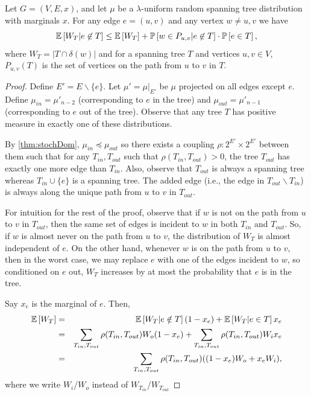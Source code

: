 \begin{lemma}\label{lem:wpath}
Let $G=(V,E,x)$, and let $\mu$ be a $\lambda$-uniform random spanning tree distribution with marginals $x$.
For any edge $e=(u,v)$ and any vertex $w\neq u,v$ we have
 $$ {\mathbb{E}}\left[W_T | e\not\in T\right] \leq {\mathbb{E}}\left[W_T\right] + {\mathbb{P}}\left[w\in P_{u,v} | e \not\in T\right]\cdot{\mathbb{P}}\left[e\in T\right] ,$$
 where $W_T=|T\cap \delta(w)|$ and for a spanning tree $T$ and vertices $u,v\in V$, $P_{u,v}(T)$ is the set of vertices on the path from $u$ to $v$ in $T$.
\end{lemma}
\begin{proof}
Define $E'=E\smallsetminus \{e\}$.
Let $\mu' = \mu|_{E'}$ be $\mu$ projected on all edges except $e$. Define $\mu_{in} = \mu'_{n-2}$ (corresponding to $e$ in the tree) and $\mu_{out}=\mu'_{n-1}$ (corresponding to $e$ out of the tree). Observe that any tree $T$ has positive measure  in exactly one of these distributions.

By \cref{thm:stochDom}, $\mu_{in} \preceq \mu_{out}$ so there exists a coupling $\rho:2^{E'}\times 2^{E'}$ between them such that for any $T_{in}, T_{out}$ such that $\rho(T_{in}, T_{out})>0$, the tree $T_{out}$ has exactly one more edge than $T_{in}$. Also, observe that $T_{out}$ is always a spanning tree whereas $T_{in}\cup\{e\}$ is a spanning tree. The added edge (i.e., the edge in $T_{out}\smallsetminus T_{in}$) is always along the unique path from $u$ to $v$ in $T_{out}$.

For intuition for the rest of the proof, observe that if $w$ is not on the path from $u$ to $v$ in $T_{out}$, then the same set of edges is incident to $w$ in both $T_{in}$ and $T_{out}$. So, if $w$ is almost never on the path from $u$ to $v$, the distribution of $W_T$ is almost independent of $e$. On the other hand, whenever $w$ is on the path from $u$ to $v$, then in the worst case, we may replace $e$ with one of the edges incident to $w$, so conditioned on $e$ out, $W_T$ increases by at most the probability that $e$ is in the tree.

Say $x_e$ is the marginal of $e$. Then, 
\begin{eqnarray}
	{\mathbb{E}}\left[W_T\right] &=& {\mathbb{E}}\left[W_T | e\notin T\right] (1-x_e) + {\mathbb{E}}\left[W_T | e\in T\right] x_e\nonumber \\
	&=& \sum_{T_{in},T_{out}} \rho(T_{in},T_{out}) W_{o} (1-x_e) + \sum_{T_{in},T_{out}} \rho(T_{in},T_{out}) W_{i} x_e\nonumber \\
	&=& \sum_{T_{in},T_{out}} \rho(T_{in},T_{out}) ((1-x_e)W_o + x_e W_i),\label{eq:EZT}
\end{eqnarray}
where we write $W_i$/$W_o$ instead of $W_{T_{in}}$/$W_{T_{out}}$


\end{proof}
